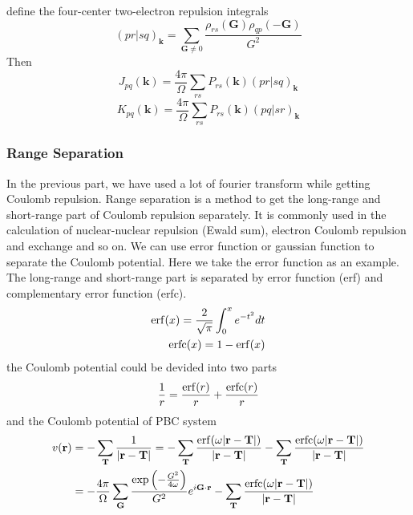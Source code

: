\documentclass{article}
\begin{document}
            define the four-center two-electron repulsion integrals
            \begin{equation}
                (pr|sq)_{\textbf{k}} = \sum_{\textbf{G}\neq 0}\frac{\rho_{rs}(\textbf{G})\rho_{qp}(-\textbf{G})}{G^2}
            \end{equation}
            Then
            \begin{equation}
                J_{pq}(\textbf{k}) = \frac{4\pi}{\Omega}\sum_{rs}P_{rs}(\textbf{k})(pr|sq)_{\textbf{k}}
            \end{equation}
            \begin{equation}
                K_{pq}(\textbf{k}) = \frac{4\pi}{\Omega}\sum_{rs}P_{rs}(\textbf{k})(pq|sr)_{\textbf{k}}
            \end{equation}

        \subsubsection{Range Separation}
            In the previous part, we have used a lot of fourier transform while getting Coulomb repulsion.
            Range separation\cite{sun2020exact,Ye2021} is a method to get the long-range and short-range part of Coulomb repulsion separately.
            It is commonly used in the calculation of nuclear-nuclear repulsion (Ewald sum), 
            electron Coulomb repulsion and exchange and so on.
            We can use error function\cite{Ye2021} or gaussian function\cite{SHIMAZAKI2016132} to separate the Coulomb potential.
            Here we take the error function as an example.
            The long-range and short-range part is separated by error function (erf) and complementary error function (erfc).
            \begin{align}
                {\rm erf}(x) = \frac{2}{\sqrt{\pi}}\int_{0}^{x}e^{-t^2}dt\\
                {\rm erfc}(x) = 1-{\rm erf}(x)
            \end{align}
            the Coulomb potential could be devided into two parts
            \begin{equation}
                \frac{1}{r} = \frac{{\rm erf}(r)}{r} + \frac{{\rm erfc}(r)}{r}
            \end{equation}
            and the Coulomb potential of PBC system
            \begin{align}
                v(\textbf{r}) &= -\sum_{\textbf{T}}\frac{1}{|\textbf{r}-\textbf{T}|} = 
                -\sum_{\textbf{T}}\frac{{\rm erf}(\omega |\textbf{r}-\textbf{T}|)}{|\textbf{r}-\textbf{T}|} 
                -\sum_{\textbf{T}}\frac{{\rm erfc}(\omega |\textbf{r}-\textbf{T}|)}{|\textbf{r}-\textbf{T}|}\notag\\
                &= -\frac{4\pi}{\Omega}\sum_{\textbf{G}}\frac{\exp\left(-\frac{G^2}{4\omega}\right)}{G^2}e^{i\textbf{G}\cdot\textbf{r}} 
                -\sum_{\textbf{T}}\frac{{\rm erfc}(\omega |\textbf{r}-\textbf{T}|)}{|\textbf{r}-\textbf{T}|}
            \end{align} 
\end{document}

